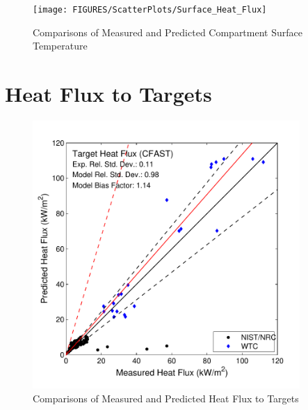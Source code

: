 \begin{figure}
\begin{center}
\texttt{[image: FIGURES/ScatterPlots/Surface\_Heat\_Flux]} 
\end{center}
\caption{Comparisons of Measured and Predicted Compartment Surface Temperature} \label{fig:Surface_Flux_Scatter}
\end{figure}

\section{Heat Flux to Targets}

\begin{figure}
\begin{center}
\includegraphics[width=4in]{FIGURES/ScatterPlots/Target_Heat_Flux}
\end{center}
\caption{Comparisons of Measured and Predicted Heat Flux to Targets} \label{fig:Target_Flux_Scatter}
\end{figure}

